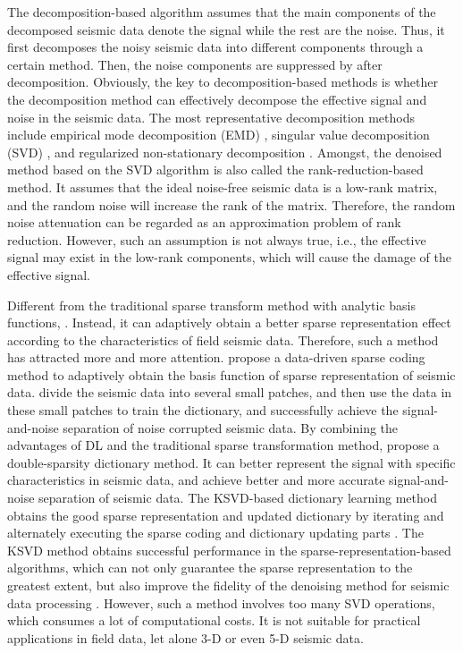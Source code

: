 The decomposition-based algorithm assumes that the main components of the decomposed seismic data denote the signal while the rest are the noise. Thus, it first decomposes the noisy seismic data into different components through a certain method. Then, the noise components are suppressed by  after decomposition. Obviously, the key to decomposition-based methods is whether the decomposition method can effectively decompose the effective signal and noise in the seismic data. The most representative decomposition methods include empirical mode decomposition (EMD) \cite[]{huang1998empirical}, singular value decomposition (SVD) \cite[]{bekara2007local}, and regularized non-stationary decomposition \cite[]{fomel2013seismic,lv2019noise}. Amongst, the denoised method based on the SVD algorithm is also called the rank-reduction-based method. It assumes that the ideal noise-free seismic data is a low-rank matrix, and the random noise will increase the rank of the matrix. Therefore, the random noise attenuation can be regarded as an approximation problem of rank reduction. However, such an assumption is not always true, i.e., the effective signal may exist in the low-rank components, which will cause the damage of the effective signal.

Different from the traditional sparse transform method with analytic basis functions, . Instead, it can adaptively obtain a better sparse representation effect according to the characteristics of field seismic data. Therefore, such a method has attracted more and more attention. \cite{kaplan2009sparse} propose a data-driven sparse coding method to adaptively obtain the basis function of sparse representation of seismic data. \cite{beckouche2014simultaneous} divide the seismic data into several small patches, and then use the data in these small patches to train the dictionary, and successfully achieve the signal-and-noise separation of noise corrupted seismic data. By combining the advantages of DL and the traditional sparse transformation method, \cite{chen2016double} propose a double-sparsity dictionary method. It can better represent the signal with specific characteristics in seismic data, and achieve better and more accurate signal-and-noise separation of seismic data. The KSVD-based dictionary learning method obtains the good sparse representation and updated dictionary by iterating and alternately executing the sparse coding and dictionary updating parts \cite[]{abma1995lateral}. The KSVD method obtains successful performance in the sparse-representation-based algorithms, which can not only guarantee the sparse representation to the greatest extent, but also improve the fidelity of the denoising method for seismic data processing \cite[]{sahoo2013dictionary}. However, such a method involves too many SVD operations, which consumes a lot of computational costs. It is not suitable for practical applications in field data, let alone 3-D or even 5-D seismic data. 

